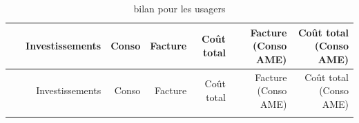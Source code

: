 \documentclass[]{article}
\begin{document}
\begin{longtable}[]{@{}crrrrrr@{}}
\caption{bilan pour les usagers}\tabularnewline
\toprule
\begin{minipage}[b]{0.12\columnwidth}\centering\strut
~\strut
\end{minipage} & \begin{minipage}[b]{0.13\columnwidth}\raggedleft\strut
Investissements\strut
\end{minipage} & \begin{minipage}[b]{0.06\columnwidth}\raggedleft\strut
Conso\strut
\end{minipage} & \begin{minipage}[b]{0.07\columnwidth}\raggedleft\strut
Facture\strut
\end{minipage} & \begin{minipage}[b]{0.09\columnwidth}\raggedleft\strut
Coût total\strut
\end{minipage} & \begin{minipage}[b]{0.16\columnwidth}\raggedleft\strut
Facture (Conso AME)\strut
\end{minipage} & \begin{minipage}[b]{0.17\columnwidth}\raggedleft\strut
Coût total (Conso AME)\strut
\end{minipage}\tabularnewline
\midrule
\endfirsthead
\toprule
\begin{minipage}[b]{0.12\columnwidth}\centering\strut
~\strut
\end{minipage} & \begin{minipage}[b]{0.13\columnwidth}\raggedleft\strut
Investissements\strut
\end{minipage} & \begin{minipage}[b]{0.06\columnwidth}\raggedleft\strut
Conso\strut
\end{minipage} & \begin{minipage}[b]{0.07\columnwidth}\raggedleft\strut
Facture\strut
\end{minipage} & \begin{minipage}[b]{0.09\columnwidth}\raggedleft\strut
Coût total\strut
\end{minipage} & \begin{minipage}[b]{0.16\columnwidth}\raggedleft\strut
Facture (Conso AME)\strut
\end{minipage} & \begin{minipage}[b]{0.17\columnwidth}\raggedleft\strut
Coût total (Conso AME)\strut
\end{minipage}\tabularnewline
\midrule
\endhead
\begin{minipage}[t]{0.12\columnwidth}\centering\strut

\end{minipage}
\end{longtable}
\end{document}
